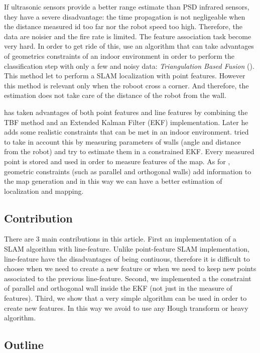 \documentclass[a4paper,12pt]{article}
\begin{document}
If ultrasonic sensors provide a better range estimate than PSD infrared sensors, they have a severe disadvantage: the time propagation is not negligeable when the distance measured id too far nor the robot speed too high. Therefore, the data are noisier and the fire rate is limited. The feature association  task become very hard. In order to get ride of this, \cite{zunino2001simultaneous} use an algorithm that can take advantages of geometrics constraints of an indoor environment in order to perform the classification step with only a few and noisy data: \textit{Triangulation Based Fusion} (\cite{wijk1998triangulation}). This method let to perform a SLAM localization with point features.
However this method is relevant only when the roboot cross a corner. And therefore, the estimation does not take care of the distance of the robot from the wall.

\cite{choi2005robust} has taken advantages of both point features and line features by combining the TBF method and an Extended Kalman Filter (EKF) implementation.
Later he adds some realistic constraints that can be met in an indoor environment.
\cite{choi2008line} tried to take in account this by measuring parameters of walls (angle and distance from the robot) and try to estimate them in a constrained EKF. Every measured point is stored and used in order to measure features of the map. As for \cite{nguyen2006orthogonal}, geometric constraints (such as parallel and orthogonal walls) add information to the map generation and in this way we can have a better estimation of localization and mapping.

\subsection{Contribution}
There are 3 main contributions in this article.
First an implementation of a SLAM algorithm with line-feature. Unlike point-feature SLAM implementation, line-feature have the disadvantages of being contiuous, therefore it is difficult to choose when we need to create a new feature or when we need to keep new points associated to the previous line-feature.
Second, we implemented a the constraint of parallel and orthogonal wall inside the EKF (not just in the measure of features).
Third, we show that a very simple algorithm can be used in order to create new features. In this way we avoid to use any Hough transform or heavy algorithm.

\subsection{Outline}
\end{document}
